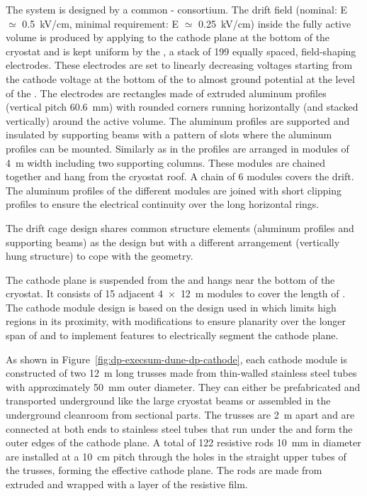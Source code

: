 The  system is designed by a common - consortium.
The drift field (nominal: E ${\simeq}$ \SI{0.5}{kV/cm}, minimal requirement: E ${\simeq}$ \SI{0.25}{kV/cm}) inside the fully active  volume is produced by applying  to the cathode plane at the bottom of the cryostat and is kept uniform by the , a stack of \num{199} equally spaced, field-shaping electrodes. %
These electrodes are set to linearly decreasing voltages starting from the cathode voltage at the bottom of the  to almost ground potential at the level of the . The electrodes are rectangles made of extruded aluminum profiles (vertical pitch \SI{60.6}{mm}) with rounded corners running horizontally (and stacked vertically) around the active volume. The aluminum profiles are supported and insulated by  supporting beams with a pattern of slots where the aluminum profiles can be mounted. Similarly as in  the profiles are arranged in modules of \SI{4}{m} width including two  supporting columns. These modules are chained together and  hang from the cryostat roof. A chain of \num{6} modules covers the \dpmaxdrift drift. The aluminum profiles of the different modules are joined with short clipping profiles to ensure the electrical continuity over the \dptpclen long horizontal rings. 

The drift cage design shares common structure elements (aluminum profiles and  supporting beams) as the   design but with a different arrangement (vertically hung structure) to cope with the  geometry.

The cathode plane  is suspended from the  and hangs near the  bottom of the cryostat. It consists of 15 adjacent \SI{4x12}{m} %
modules to cover the \dptpclen length of . The cathode module design is based on the design used in  which limits high \efield
regions in its proximity, with modifications to ensure planarity over the longer \dptpcwdth span of  and to implement features to electrically segment the cathode plane.

As shown in  Figure~\ref{fig:dp-execsum-dune-dp-cathode}, each cathode module is constructed of two \SI{12}{m} long trusses made from thin-walled stainless steel tubes with approximately \SI{50}{mm} outer diameter. They can either be prefabricated and transported underground like the large cryostat beams or assembled in the underground cleanroom from sectional parts. The trusses are \SI{2}{m} apart and are connected at both ends to stainless steel tubes that run under the  and form the outer edges of the cathode plane. A total of 122 resistive rods \SI{10}{mm} in diameter are installed at a \SI{10}{cm} pitch through the holes in the straight upper tubes of the trusses, forming the effective cathode plane. The rods are made from extruded  and wrapped with a layer of the resistive film.

